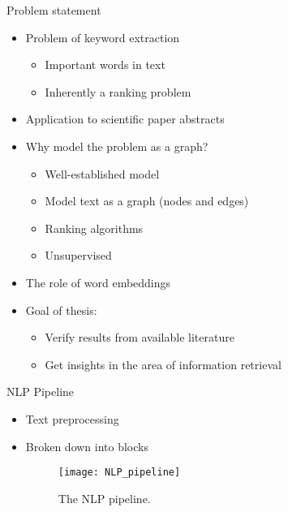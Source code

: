 \documentclass[t]{beamer}
\begin{document}
	
	\begin{frame}{Problem statement}
		\begin{itemize}
			\item Problem of keyword extraction 
			\begin{itemize}
				\item Important words in text
				\item Inherently a ranking problem
			\end{itemize}
			\item Application to scientific paper abstracts
			\item Why model the problem as a graph?
			\begin{itemize}
				\item Well-established model
				\item Model text as a graph (nodes and edges)
				\item Ranking algorithms
				\item Unsupervised
			\end{itemize}
			\item The role of word embeddings
			\item Goal of thesis:
			\begin{itemize}
				\item Verify results from available literature
				\item Get insights in the area of information retrieval
			\end{itemize}
		\end{itemize}
	\end{frame}

	\begin{frame}{NLP Pipeline}
		\begin{itemize}
			\item Text preprocessing
			\item Broken down into blocks
			\begin{figure}[H]
				\centering
				\texttt{[image: NLP\_pipeline]}		
				\caption{The NLP pipeline.}
				\label{NLP_pipeline_label}
			\end{figure}
		\end{itemize}
	\end{frame}
\end{document}
